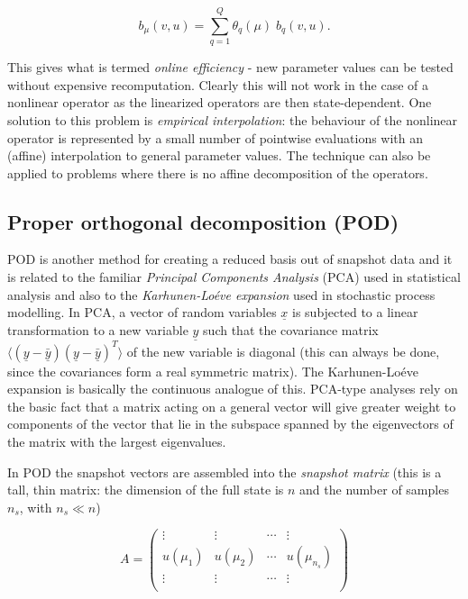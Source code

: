 \begin{equation} 
b_{\mu} (v,u)  = \sum_{q=1}^Q \theta_q({\mu}) \; b_q (v,u).
\end{equation}

This gives what is termed {\it online efficiency} - new parameter values can be tested without expensive recomputation.  
Clearly this will not work in the case of a nonlinear operator as the linearized operators are then state-dependent.  
One solution to this problem is {\it empirical interpolation}: the behaviour of the nonlinear operator is represented by a small number of pointwise evaluations with an (affine) interpolation to general parameter values.  
The technique can also be applied to problems where there is no affine decomposition of the operators.

\subsection{Proper orthogonal decomposition (POD)} \label{POD}

POD is another method for creating a reduced basis out of snapshot data and it is related to the familiar {\it Principal Components Analysis} (PCA) used in statistical analysis \cite{gershenfeld} and also to the {\it Karhunen-Lo\'eve expansion} used in stochastic process modelling.  
In PCA, a vector of random variables $\underline{x}$ is subjected to a linear transformation to a new variable $\underline{y}$ such that the covariance matrix $\langle (\underline{y}-\underline{\bar{y}})(\underline{y}-\underline{\bar{y}})^T \rangle$ of the new variable is diagonal (this can always be done, since the covariances form a real symmetric matrix).  
The Karhunen-Lo\'eve expansion is basically the continuous analogue of this.  
PCA-type analyses rely on the basic fact that a matrix acting on a general vector will give greater weight to components of the vector that lie in the subspace spanned by the eigenvectors of the matrix with the largest eigenvalues. 

In POD the snapshot vectors are assembled into the {\it snapshot matrix} (this is a tall, thin matrix: the dimension of the full state is $n$ and the number of samples $n_s$, with $n_s \ll n$)

\begin{equation}
A=
\begin{pmatrix}
\vdots & \vdots & \cdots & \vdots\\
u(\mu_1) & u(\mu_2) & \cdots & u(\mu_{n_s})\\
\vdots & \vdots & \cdots & \vdots\\ 
\end{pmatrix}
\end{equation}


